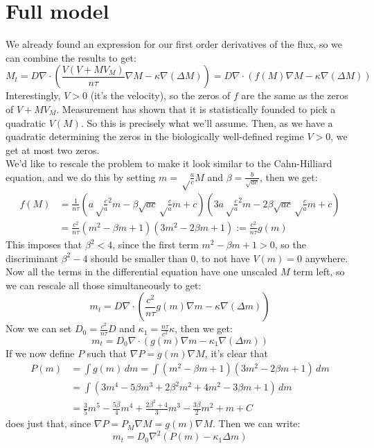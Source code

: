 \documentclass[a4paper]{jpconf}
\begin{document}
\section{Full model}
We already found an expression for our first order derivatives of the flux, so we can combine the results to get:
\[
M_t = D\nabla \cdot \left(\frac{V(V+MV_M)}{n\tau} \nabla M -\kappa \nabla (\Delta M)\right) = D\nabla \cdot \left(f(M) \nabla M -\kappa \nabla (\Delta M)\right)
\]
Interestingly, $V>0$ (it's the velocity), so the zeros of $f$ are the same as the zeros of $V+MV_M$. Measurement has shown that it is statistically founded to pick a quadratic $V(M)$. So this is precisely what we'll assume. Then, as we have a quadratic determining the zeros in the biologically well-defined regime $V>0$, we get at most two zeros. \\
We'd like to rescale the problem to make it look similar to the Cahn-Hilliard equation, and we do this by setting $m = \sqrt\frac{a}{c}M$ and $\beta = \frac{b}{\sqrt{ac}}$, then we get:
\[\begin{aligned}
 f(M)&=\frac{1}{n\tau } \left(a \sqrt\frac{c}{a}^2 m-\beta\sqrt{ac}\sqrt\frac{c}{a}m+c\right)\left( 3a \sqrt\frac{c}{a}^2 m-2\beta\sqrt{ac}\sqrt\frac{c}{a}m+c\right)\\
&=\frac{c^2}{n\tau}(m^2-\beta m+1)(3m^2-2\beta m+1):= \frac{c^2}{n\tau }g(m)
\end{aligned}\]
This imposes that $\beta^2<4$, since the first term $m^2-\beta m+1>0$, so the discriminant $\beta^2-4$ should be smaller than $0$, to not have $V(m)=0$ anywhere. Now all the terms in the differential equation have one unscaled $M$ term left, so we can rescale all those simultaneously to get:
\[
m_t = D\nabla \cdot \left(\frac{c^2}{n\tau}g(m) \nabla m -\kappa \nabla (\Delta m)\right)
\]
Now we can set $D_0 = \frac{c^2}{n\tau}D$ and $\kappa_1 =\frac{n\tau}{c^2}\kappa$, then we get:
\[
m_t = D_0\nabla \cdot \left(g(m) \nabla m -\kappa_1 \nabla (\Delta m)\right)
\]
If we now define $P$ such that $\nabla P=g(m)\nabla M$, it's clear that 
\[\begin{aligned}P(m)&=\int g(m) \, dm=
\int (m^2 - \beta m + 1)(3m^2 - 2\beta m + 1) \, dm \\
&=\int (3m^4 - 5\beta m^3 + 2\beta^2 m^2 + 4m^2 - 3\beta m + 1) \, dm\\
&= \frac{3}{5}m^5 - \frac{5\beta}{4}m^4 + \frac{2\beta^2 + 4}{3}m^3 - \frac{3\beta}{2}m^2 + m + C\end{aligned}\]
does just that, since $\nabla P=P_M\nabla M = g(m)\nabla M$. Then we can write:
\[
m_t = D_0\nabla^2(P(m)-\kappa_1\Delta m)
\]
\end{document}
